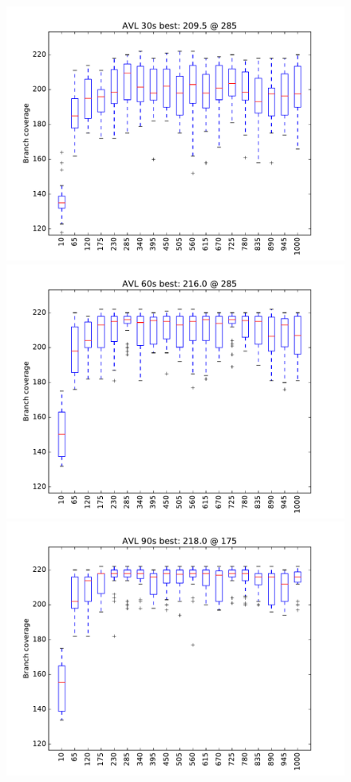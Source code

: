 \begin{figure}
\includegraphics[width=\columnwidth]{graphs/AVLrand30}
\includegraphics[width=\columnwidth]{graphs/AVLrand60}
\includegraphics[width=\columnwidth]{graphs/AVLrand90}
\end{figure}

